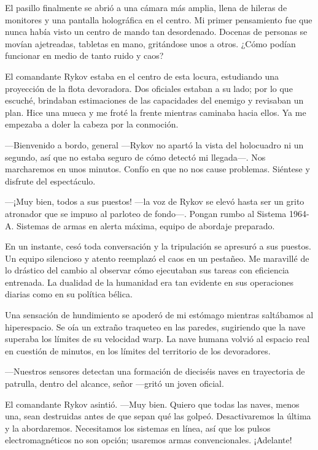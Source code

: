 El pasillo finalmente se abrió a una cámara más amplia, llena de hileras de monitores y una pantalla holográfica en el centro. Mi primer pensamiento fue que nunca había visto un centro de mando tan desordenado. Docenas de personas se movían ajetreadas, tabletas en mano, gritándose unos a otros. ¿Cómo podían funcionar en medio de tanto ruido y caos?

El comandante Rykov estaba en el centro de esta locura, estudiando una proyección de la flota devoradora. Dos oficiales estaban a su lado; por lo que escuché, brindaban estimaciones de las capacidades del enemigo y revisaban un plan. Hice una mueca y me froté la frente mientras caminaba hacia ellos. Ya me empezaba a doler la cabeza por la conmoción.

—Bienvenido a bordo, general —Rykov no apartó la vista del holocuadro ni un segundo, así que no estaba seguro de cómo detectó mi llegada—. Nos marcharemos en unos minutos. Confío en que no nos cause problemas. Siéntese y disfrute del espectáculo.

—¡Muy bien, todos a sus puestos! —la voz de Rykov se elevó hasta ser un grito atronador que se impuso al parloteo de fondo—. Pongan rumbo al Sistema 1964-A. Sistemas de armas en alerta máxima, equipo de abordaje preparado.

En un instante, cesó toda conversación y la tripulación se apresuró a sus puestos. Un equipo silencioso y atento reemplazó el caos en un pestañeo. Me maravillé de lo drástico del cambio al observar cómo ejecutaban sus tareas con eficiencia entrenada. La dualidad de la humanidad era tan evidente en sus operaciones diarias como en su política bélica.

Una sensación de hundimiento se apoderó de mi estómago mientras saltábamos al hiperespacio. Se oía un extraño traqueteo en las paredes, sugiriendo que la nave superaba los límites de su velocidad warp. La nave humana volvió al espacio real en cuestión de minutos, en los límites del territorio de los devoradores.

—Nuestros sensores detectan una formación de dieciséis naves en trayectoria de patrulla, dentro del alcance, señor —gritó un joven oficial.

El comandante Rykov asintió. —Muy bien. Quiero que todas las naves, menos una, sean destruidas antes de que sepan qué las golpeó. Desactivaremos la última y la abordaremos. Necesitamos los sistemas en línea, así que los pulsos electromagnéticos no son opción; usaremos armas convencionales. ¡Adelante!

